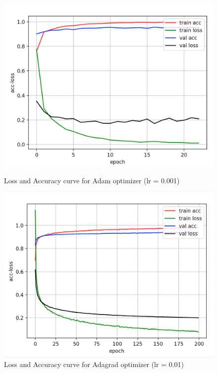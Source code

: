 \documentclass{article}
\begin{document}
\begin{figure}[htbp]
\centering
\begin{minipage}[t]{0.48\textwidth}
\centering
\includegraphics[scale = 0.3]{adam_0_001.png}
\caption{Loss and Accuracy curve for Adam optimizer (lr = 0.001)}
\end{minipage}
\begin{minipage}[t]{0.48\textwidth}
\centering
\includegraphics[scale = 0.3]{adagrad_0_01.png}
\caption{Loss and Accuracy curve for Adagrad optimizer (lr = 0.01)}
\end{minipage}
\end{figure}
\end{document}

